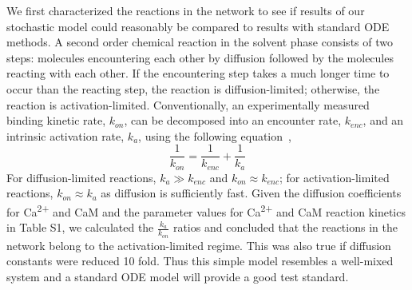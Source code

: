 \documentclass[10pt,letterpaper]{article}
\begin{document}
We first characterized the reactions in the network to see if results of our stochastic model could reasonably be compared to results with standard ODE methods. A second order chemical reaction in the solvent phase consists of two steps: molecules encountering each other by diffusion followed by the molecules reacting with each other. If the encountering step takes a much longer time to occur than the reacting step, the reaction is diffusion-limited; otherwise, the reaction is activation-limited. Conventionally, an experimentally measured binding kinetic rate, $k_{on}$, can be decomposed into an encounter rate, $k_{enc}$, and an intrinsic activation rate, $k_{a}$, using the following equation~\cite{Rice:198505},
\begin{equation}\frac{1}{k_{on}}=\frac{1}{k_{enc}}+\frac{1}{k_a}\end{equation}
For diffusion-limited reactions, $k_a \gg k_{enc}$ and $k_{on} \approx k_{enc}$; for activation-limited reactions, $k_{on} \approx k_a$ as diffusion is sufficiently fast. Given the diffusion coefficients for Ca\textsuperscript{2+} and CaM and the parameter values for Ca\textsuperscript{2+} and CaM reaction kinetics in Table S1, we calculated the $\frac{k_a}{k_{on}}$ ratios and concluded that the reactions in the network belong to the activation-limited regime. This was also true if diffusion constants were reduced 10 fold. Thus this simple model resembles a well-mixed system and a standard ODE model will provide a good test standard. 
\end{document}
